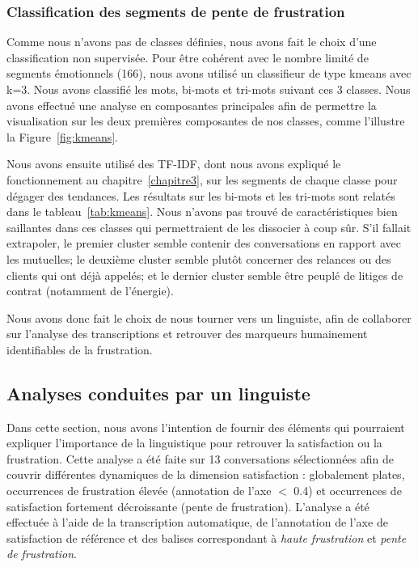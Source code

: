 \subsubsection{Classification des segments de pente de frustration}
Comme nous n'avons pas de classes définies, nous avons fait le choix d'une classification non supervisée. Pour être cohérent avec le nombre limité de segments émotionnels (166), nous avons utilisé un classifieur de type kmeans avec k=3. Nous avons classifié les mots, bi-mots et tri-mots suivant ces 3 classes. Nous avons effectué une analyse en composantes principales afin de permettre la visualisation sur les deux premières composantes de nos classes, comme l'illustre la Figure~\ref{fig:kmeans}.



Nous avons ensuite utilisé des TF-IDF, dont nous avons expliqué le fonctionnement au chapitre~\ref{chapitre3}, sur les segments de chaque classe pour dégager des tendances. Les résultats sur les bi-mots et les tri-mots sont relatés dans le tableau~\ref{tab:kmeans}. Nous n'avons pas trouvé de caractéristiques bien saillantes dans ces classes qui permettraient de les dissocier à coup sûr. S'il fallait extrapoler, le premier cluster semble contenir des conversations en rapport avec les mutuelles; le deuxième cluster semble plutôt concerner des relances ou des clients qui ont déjà appelés; et le dernier cluster semble être peuplé de litiges de contrat (notamment de l'énergie).



Nous avons donc fait le choix de nous tourner vers un linguiste, afin de collaborer sur l'analyse des transcriptions et retrouver des marqueurs humainement identifiables de la frustration.


\subsection{Analyses conduites par un linguiste}
Dans cette section, nous avons l'intention de fournir des éléments qui pourraient expliquer l'importance de la linguistique pour retrouver la satisfaction ou la frustration.
Cette analyse a été faite sur 13 conversations sélectionnées afin de couvrir différentes dynamiques de la dimension satisfaction : globalement plates, occurrences de frustration élevée (annotation de l'axe $<$ 0.4) et occurrences de satisfaction fortement décroissante (pente de frustration).
L'analyse a été effectuée à l'aide de la transcription automatique, de l'annotation de l'axe de satisfaction de référence et des balises correspondant à \textit{haute frustration} et \textit{pente de frustration}.

